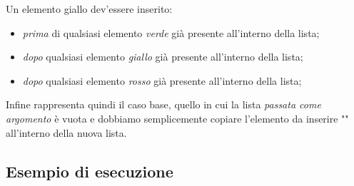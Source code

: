 Un elemento giallo dev'essere inserito:

\begin{itemize}
	\item \emph{prima} di qualsiasi elemento \emph{verde} già presente all'interno della lista;
	\item \emph{dopo} qualsiasi elemento \emph{giallo} già presente all'interno della lista;
	\item \emph{dopo} qualsiasi elemento \emph{rosso} già presente all'interno della lista;
\end{itemize}

Infine  rappresenta quindi il caso base, quello in cui la lista \emph{passata come argomento} è vuota e dobbiamo semplicemente copiare l'elemento da inserire "" all'interno della nuova lista.

\subsection{Esempio di esecuzione}


